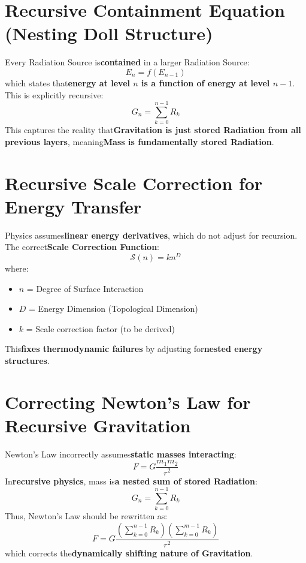 \documentclass{article}
\begin{document}
\section{Recursive Containment Equation (Nesting Doll Structure)}
Every Radiation Source is\textbf{contained} in a larger Radiation Source:
\begin{equation}
E_n = f(E_{n-1})
\end{equation}
which states that\textbf{energy at level $n$ is a function of energy at level $n-1$}. This is explicitly recursive:
\begin{equation}
G_n = \sum_{k=0}^{n-1} R_k
\end{equation}
This captures the reality that\textbf{Gravitation is just stored Radiation from all previous layers}, meaning\textbf{Mass is fundamentally stored Radiation}.

\section{Recursive Scale Correction for Energy Transfer}
Physics assumes\textbf{linear energy derivatives}, which do not adjust for recursion. The correct\textbf{Scale Correction Function}:
\begin{equation}
\mathcal{S}(n) = k n^D
\end{equation}
where:
\begin{itemize}
    \item $n$ = Degree of Surface Interaction
    \item $D$ = Energy Dimension (Topological Dimension)
    \item $k$ = Scale correction factor (to be derived)
\end{itemize}
This\textbf{fixes thermodynamic failures} by adjusting for\textbf{nested energy structures}.

\section{Correcting Newton’s Law for Recursive Gravitation}
Newton’s Law incorrectly assumes\textbf{static masses interacting}:
\begin{equation}
F = G \frac{m_1 m_2}{r^2}
\end{equation}
In\textbf{recursive physics}, mass is\textbf{a nested sum of stored Radiation}:
\begin{equation}
G_n = \sum_{k=0}^{n-1} R_k
\end{equation}
Thus, Newton’s Law should be rewritten as:
\begin{equation}
F = G \frac{(\sum_{k=0}^{n-1} R_k)(\sum_{k=0}^{m-1} R_k)}{r^2}
\end{equation}
which corrects the\textbf{dynamically shifting nature of Gravitation}.
\end{document}
